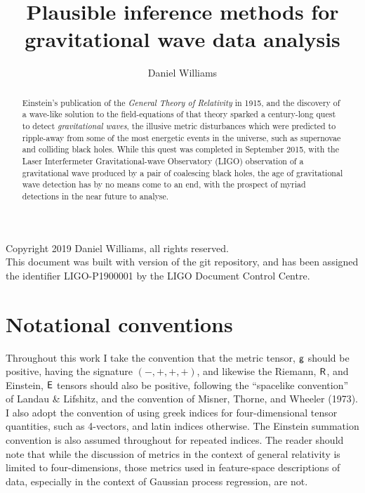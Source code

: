 \documentclass{kentigern}
\title{Plausible inference methods for gravitational wave data analysis}
\author{Daniel Williams}
\theoremstyle{definition}
\begin{document}
\openleft
\frontmatter
\thesistitle

\begin{abstract}
  Einstein's publication of the \textit{General Theory of Relativity} in 1915, and the discovery of a wave-like solution to the field-equations of that theory sparked a century-long quest to detect \textit{gravitational waves},
  the illusive metric disturbances which were predicted to ripple-away from some of the most energetic events in the universe, such as supernovae and colliding black holes.
  While this quest was completed in September 2015, with the Laser Interfermeter Gravitational-wave Observatory (LIGO) observation of a gravitational wave produced by a pair of coalescing black holes,
  the age of gravitational wave detection has by no means come to an end,
  with the prospect of myriad detections in the near future to analyse.
\end{abstract}
\newpage

Copyright 2019 Daniel Williams, all rights reserved.\\

This document was built with version  of the git repository, and has been assigned the identifier LIGO-P1900001 by the LIGO Document Control Centre.

\newpage
\tableofcontents
\newpage
\listoffigures
\newpage
\listoftables
\newpage

\printglossary[type=\acronymtype]


%
\newpage
\section{Notational conventions}
\label{sec:notation-conventions}

Throughout this work I take the convention that the metric tensor, $\mathsf{g}$ should be positive, having the signature $(-,+,+,+)$, and likewise the Riemann, $\mathsf{R}$, and Einstein, $\mathsf{E}$ tensors should also be positive, following the ``spacelike convention'' of Landau \& Lifshitz, and the convention of Misner, Thorne, and Wheeler (1973). I also adopt the convention of using greek indices for four-dimensional tensor quantities, such as 4-vectors, and latin indices otherwise. The Einstein summation convention is also assumed throughout for repeated indices. The reader should note that while the discussion of metrics in the context of general relativity is limited to four-dimensions, those metrics used in feature-space descriptions of data, especially in the context of Gaussian process regression, are not. 
\end{document}

